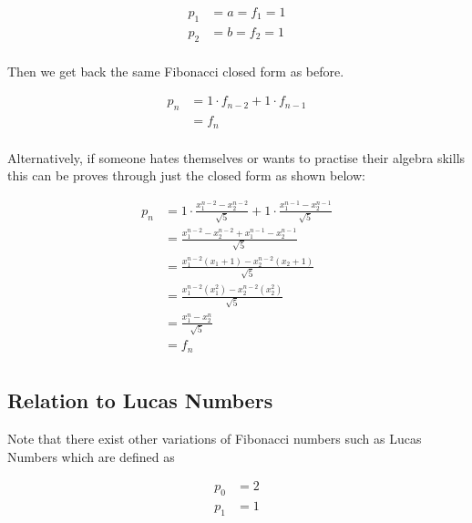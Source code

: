 \documentclass[a4paper]{article}
\begin{document}
\begin{equation*}
\begin{aligned}
p_1 &= a= f_1 = 1  \\
p_2 &= b= f_2 = 1  \\
\end{aligned}
\end{equation*}

Then we get back the same Fibonacci closed form as before.

\begin{equation}
\begin{split}
p_n &= 1 \cdot f_{n-2} + 1 \cdot f_{n-1} \\
&= f_n  \\
\end{split}
\end{equation}

Alternatively, if someone hates themselves or wants to practise their algebra skills this can be proves through just the closed form as shown below:

\begin{equation*}
\begin{split}
p_n &= 1 \cdot \frac{x_1^{n-2} - x_2^{n-2}}{\sqrt{5}} + 1 \cdot \frac{x_1^{n-1} - x_2^{n-1}}{\sqrt{5}} \\
&= \frac{x_1^{n-2} - x_2^{n-2} + x_1^{n-1} - x_2^{n-1} }{\sqrt{5}} \\
&= \frac{x_1^{n-2}(x_1 + 1) - x_2^{n-2}(x_2 + 1) }{\sqrt{5}} \\
&= \frac{x_1^{n-2}(x_1^2) - x_2^{n-2}(x_2^2) }{\sqrt{5}} \\
&= \frac{x_1^{n}- x_2^{n}}{\sqrt{5}} \\
&= f_n \\
\end{split}
\end{equation*}

\subsection{Relation to Lucas Numbers}
Note that there exist other variations of Fibonacci numbers such as Lucas Numbers which are defined as  

\begin{equation}
\begin{aligned}
p_0 &= 2  \\
p_1 &= 1  \\
\end{aligned}
\end{equation}
\end{document}
